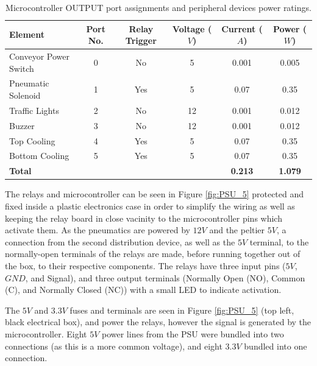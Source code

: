 \documentclass[fleqn,twoside,12pt]{report}
\begin{document}
\renewcommand{\arraystretch}{0.8}%
\begin{table}[h]
	\centering
	\caption{Microcontroller OUTPUT port assignments and peripheral devices power ratings.}
	\label{tab:micro_pinout_out}
	\begin{tabular}{lccccc}
		\toprule
		\textbf{Element}  & \textbf{Port No.}  & \textbf{Relay Trigger} & \textbf{Voltage ($V$)} & \textbf{Current ($A$)} & \textbf{Power ($W$)}\\[8pt]
		\midrule
		Conveyor Power Switch 	& 0 & No & 5 & 0.001 & 0.005 \\[4pt]
		\midrule
		Pneumatic Solenoid 		& 1 & Yes & 5 & 0.07 & 0.35 \\[4pt]
		\midrule
		Traffic Lights 			& 2 & No & 12 & 0.001 & 0.012 \\[4pt]
		\midrule
		Buzzer 					& 3 & No & 12 & 0.001 & 0.012 \\[4pt]
		\midrule
		Top Cooling 			& 4 & Yes & 5 & 0.07 & 0.35 \\[4pt]
		\midrule
		Bottom Cooling 			& 5 & Yes & 5 & 0.07 & 0.35 \\[4pt]
		\midrule
		\textbf{Total} 			&    &     &   & \textbf{0.213} & \textbf{1.079} \\[4pt]
		\bottomrule
		
	\end{tabular}
\end{table}


The relays and microcontroller can be seen in Figure \ref{fig:PSU_5} protected and fixed inside a plastic electronics case in order to simplify the wiring as well as keeping the relay board in close vacinity to the microcontroller pins which activate them. As the pneumatics are powered by $12V$ and the peltier $5V$, a connection from the second distribution device, as well as the $5V$ terminal, to the normally-open terminals of the relays are made, before running together out of the box, to their respective components. The relays have three input pins ($5V$, $GND$, and Signal), and three output terminals (Normally Open (NO), Common (C), and Normally Closed (NC)) with a small LED to indicate activation. 

The $5V$ and $3.3V$ fuses and terminals are seen in Figure \ref{fig:PSU_5} (top left, black electrical box), and power the relays, however the signal is generated by the microcontroller. Eight $5V$ power lines from the PSU were bundled into two connections (as this is a more common voltage), and eight $3.3V$ bundled into one connection. 
\end{document}
